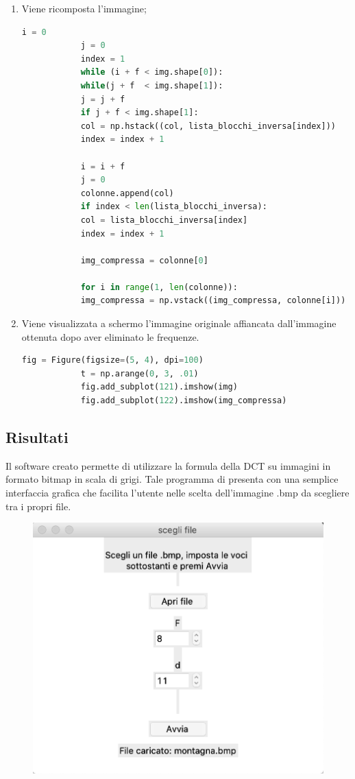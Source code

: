 \documentclass[preprint,12pt]{elsarticle}
\begin{document}
\begin{enumerate}
			\item Viene ricomposta l'immagine;
			\begin{lstlisting}[language=Python]
			i = 0
			j = 0
			index = 1
			while (i + f < img.shape[0]):
			while(j + f  < img.shape[1]):
			j = j + f
			if j + f < img.shape[1]:
			col = np.hstack((col, lista_blocchi_inversa[index]))
			index = index + 1
			
			i = i + f
			j = 0
			colonne.append(col)
			if index < len(lista_blocchi_inversa):
			col = lista_blocchi_inversa[index]
			index = index + 1
			
			img_compressa = colonne[0]
			
			for i in range(1, len(colonne)):
			img_compressa = np.vstack((img_compressa, colonne[i]))
			\end{lstlisting}
			
			\item Viene visualizzata a schermo l'immagine originale affiancata dall'immagine ottenuta dopo aver eliminato le frequenze.
			\begin{lstlisting}[language=Python]    
			fig = Figure(figsize=(5, 4), dpi=100)
			t = np.arange(0, 3, .01)
			fig.add_subplot(121).imshow(img)
			fig.add_subplot(122).imshow(img_compressa)
			\end{lstlisting}
			
		\end{enumerate}
		
		\newpage
		
		\subsection{Risultati}
		Il software creato permette di utilizzare la formula della DCT su immagini in formato bitmap in scala di grigi.
		Tale programma di presenta con una semplice interfaccia grafica che facilita l'utente nelle scelta dell'immagine .bmp da scegliere tra i propri file.
		
		\begin{figure}[H]
			\centering
			\includegraphics[width=0.5\linewidth]{gui}
		\end{figure}
	
\end{document}
